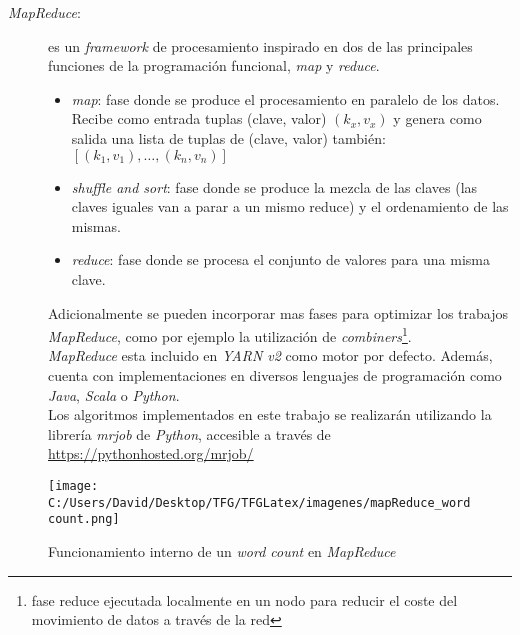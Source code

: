 \begin{description}
  \item[\textit{MapReduce}:] es un \textit{framework} de procesamiento inspirado 
  en dos de las principales funciones de la programación funcional, \textit{map} y \textit{reduce}.
  \begin{itemize}
    \item \textit{map}: fase donde se produce el procesamiento en paralelo de los datos. 
          Recibe como entrada tuplas (clave, valor) $(k_x, v_x)$ y genera como salida 
          una lista de tuplas de (clave, valor) también: $[(k_1, v_1), \ldots, (k_n, v_n)]$
    \item \textit{shuffle and sort}: fase donde se produce la mezcla de las claves 
          (las claves iguales van a parar a un mismo reduce) y el ordenamiento de las mismas.
    \item \textit{reduce}: fase donde se procesa el conjunto de valores para una misma clave.
  \end{itemize}
  Adicionalmente se pueden incorporar mas fases para optimizar los trabajos \textit{MapReduce}, como por
  ejemplo la utilización de \textit{combiners}\footnote{fase reduce ejecutada localmente
  en un nodo para reducir el coste del movimiento de datos a través de la red}.\\
  \textit{MapReduce} esta incluido en \textit{YARN v2} como motor por defecto. Además, cuenta con implementaciones en 
  diversos lenguajes de programación como \textit{Java}, \textit{Scala} o \textit{Python}.\\
  Los algoritmos implementados en este trabajo se realizarán utilizando la librería \textit{mrjob} 
  de \textit{Python}, accesible a través de \url{https://pythonhosted.org/mrjob/}
\end{description}

\begin{figure}[!htpb]
  \centering
  \texttt{[image: C:/Users/David/Desktop/TFG/TFGLatex/imagenes/mapReduce\_wordcount.png]}
  \caption[Conteo de palabras en \textit{MapReduce}]{Funcionamiento interno de un \textit{word count} en \textit{MapReduce}}
  \label{mapReduce_wordcount}
\end{figure}

\clearpage

